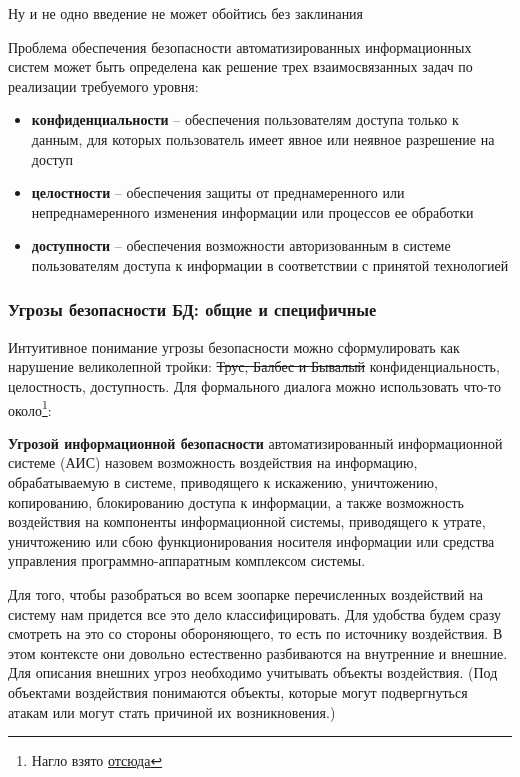 Ну и не одно введение не может обойтись без заклинания
\begin{grayquote}
	Проблема обеспечения безопасности автоматизированных информационных систем может быть определена как решение трех взаимосвязанных задач по реализации требуемого уровня:
	\begin{itemize}
		\item \textbf{конфиденциальности} -- обеспечения пользователям доступа только к данным, для которых пользователь имеет явное или неявное разрешение на доступ
		\item \textbf{целостности} -- обеспечения защиты от преднамеренного или непреднамеренного изменения информации или процессов ее обработки
		\item \textbf{доступности} -- обеспечения возможности авторизованным в системе пользователям доступа к информации в соответствии с принятой технологией
	\end{itemize}
\end{grayquote}

\subsubsection{Угрозы безопасности БД: общие и специфичные}
Интуитивное понимание угрозы безопасности можно сформулировать как нарушение великолепной тройки: \sout{Трус, Балбес и Бывалый} конфиденциальность, целостность, доступность. Для формального диалога можно использовать что-то около\footnote{Нагло взято \href{https://studopedia.su/2_30378_ugrozi-informatsionnoy-bezopasnosti-baz-dannih.html}{отсюда}}:
\begin{grayquote}
\textbf{Угрозой информационной безопасности} автоматизированный информационной системе (АИС) назовем возможность воздействия на информацию, обрабатываемую в системе, приводящего к искажению, уничтожению, копированию, блокированию доступа к информации, а также возможность воздействия на компоненты информационной системы, приводящего к утрате, уничтожению или сбою функционирования носителя информации или средства управления программно-аппаратным комплексом системы.
\end{grayquote}

Для того, чтобы разобраться во всем зоопарке перечисленных воздействий на систему нам придется все это дело классифицировать. Для удобства будем сразу смотреть на это со стороны обороняющего, то есть по источнику воздействия. В этом контексте они довольно естественно разбиваются на внутренние и внешние. Для описания внешних угроз необходимо учитывать объекты воздействия. (Под объектами воздействия понимаются объекты, которые могут подвергнуться атакам или могут стать причиной их возникновения.) \autocite{Ytebov2008}

